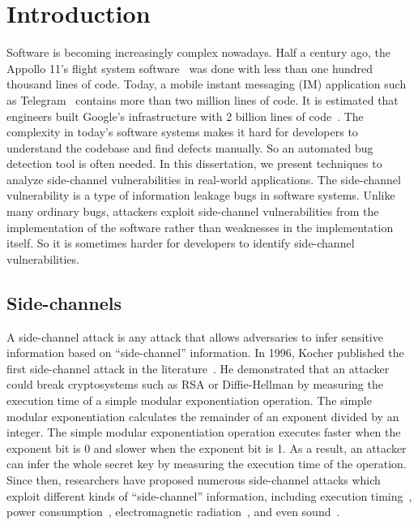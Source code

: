 
\chapter{Introduction} \label{chapter1}
Software is becoming increasingly complex nowadays. Half a century ago, the Appollo 11's flight system software~\cite{hamilton19690apollo} was done with less than one hundred thousand lines of code. 
Today, a mobile instant messaging (IM) application such as Telegram~\cite{telegram} contains more than two million lines of code. It is estimated that engineers built Google's infrastructure with 2 billion lines of code~\cite{potvin2016google}. The complexity in today's software systems makes it hard for developers to understand the codebase and find defects manually. So an automated bug detection tool is often needed. In this dissertation, we present techniques to analyze side-channel vulnerabilities in real-world applications. The side-channel vulnerability is a type of information leakage bugs in software systems. Unlike many ordinary bugs, attackers exploit side-channel vulnerabilities from the implementation of the software rather than weaknesses in the implementation itself. So it is sometimes harder for developers to identify side-channel vulnerabilities.

\section{Side-channels}
A side-channel attack is any attack that allows adversaries to infer sensitive information based on ``side-channel'' information. In 1996, Kocher published the first side-channel attack in the literature~\cite{kocher1996timing}. He demonstrated that an attacker could break cryptosystems such as RSA or Diffie-Hellman by measuring the execution time of a simple modular exponentiation operation. The simple modular exponentiation calculates the remainder of an exponent divided by an integer.  The simple modular exponentiation operation executes faster when the exponent bit is 0 and slower when the exponent bit is 1. As a result, an attacker can infer the whole secret key by measuring the execution time of the operation. Since then, researchers have proposed numerous side-channel attacks which exploit different kinds of ``side-channel'' information, including execution timing~\cite{184415,disselkoen2017prime+,7163050}, power consumption~\cite{kar20178}, electromagnetic radiation~\cite{agrawal2002side,217605}, and even sound~\cite{chari1999towards}. 

